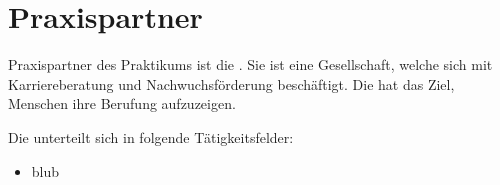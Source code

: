 
\chapter{Praxispartner}




Praxispartner des Praktikums ist die . Sie ist eine Gesellschaft, welche sich mit Karriereberatung und Nachwuchsförderung beschäftigt. Die  hat das Ziel, Menschen ihre Berufung aufzuzeigen.\\
\parencite{hero-society}

Die  unterteilt sich in folgende Tätigkeitsfelder:

\begin{itemize}
\item blub
\end{itemize}

